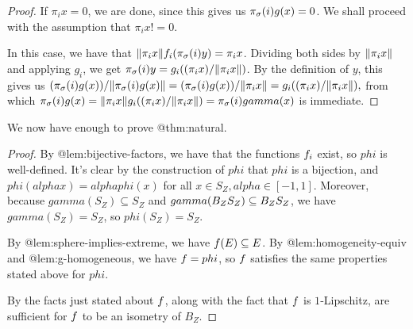 \documentclass{amsart}
\theoremstyle{definition}
\begin{document}
\begin{proof}
      If $\pi_i x = 0$, we are done, since this gives us
      $\pi_\sigma(i) g(x) = 0$. We shall proceed with the assumption that
    $\pi_i x != 0$.
  
      In this case, we have that
    $\norm{\pi_i x}f_i (\pi_\sigma(i) y) = \pi_i x$.
      Dividing both sides by $\norm{\pi_i x}$ and applying $g_i$, we get
      $\pi_\sigma(i) y = g_i ((\pi_i x)/\norm{\pi_i x})$.
      By the definition of $y$, this gives us
    $ (\pi_\sigma(i) g(x))/\norm{\pi_\sigma(i) g(x)} = (\pi_\sigma(i) g(x))/\norm{\pi_i x} = g_i ((\pi_i x)/\norm{\pi_i x}), $
      from which
      $\pi_\sigma(i) g(x) = \norm{\pi_i x}g_i ((\pi_i x)/\norm{\pi_i x}) = \pi_\sigma(i) gamma(x)$
      is immediate.
\end{proof}

We now have enough to prove @thm:natural.

\begin{proof}
    By @lem:bijective-factors, we have that the functions $f_i$ exist,
    so $phi$ is well-defined.
    It's clear by the construction of $phi$ that $phi$ is a bijection, and $phi(alpha x) = alpha phi(x)$
    for all $x \in S_Z, alpha \in [-1,1]$. Moreover, because $gamma(S_Z) \subseteq S_Z$ and $gamma(B_Z\\S_Z) \subseteq B_Z \\ S_Z$, we have $gamma(S_Z) = S_Z$, so $phi(S_Z) = S_Z$.
  
    
  
    By @lem:sphere-implies-extreme, we have $f(E) \subseteq E$.
    By @lem:homogeneity-equiv and @lem:g-homogeneous, we have $f = phi$,
    so $f$ satisfies the same properties stated above for $phi$.
  
    By \autocite{cascales:2016} %
    the facts just stated about $f$, along with the fact that $f$ is $1$‑Lipschitz, are sufficient for $f$ to be an isometry of $B_Z$.  
\end{proof}


\printbibliography
\end{document}
